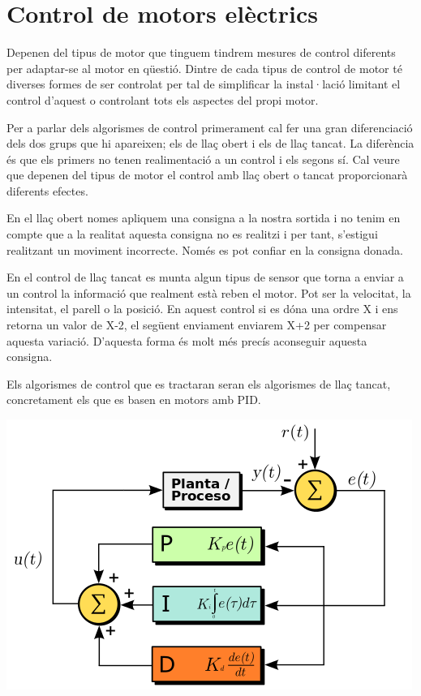 \section{Control de motors elèctrics}

Depenen del tipus de motor que tinguem tindrem mesures de control diferents per adaptar-se al motor en qüestió. Dintre de cada tipus de control de motor té diverses formes de ser controlat per tal de simplificar la instal·lació limitant el control d'aquest o controlant tots els aspectes del propi motor. 

Per a parlar dels algorismes de control primerament cal fer una gran diferenciació dels dos grups que hi apareixen; els de llaç obert i els de llaç tancat. La diferència és que els primers no tenen realimentació a un control i els segons sí. Cal veure que depenen del tipus de motor el control amb llaç obert o tancat proporcionarà diferents efectes. 

En el llaç obert nomes apliquem una consigna a la nostra sortida i no tenim en compte que a la realitat aquesta consigna no es realitzi i per tant, s'estigui realitzant un moviment incorrecte. Només es pot confiar en la consigna donada.

En el control de llaç tancat es munta algun tipus de sensor que torna a enviar a un control la informació que realment està reben el motor. Pot ser la velocitat, la intensitat, el parell o la posició. En aquest control si es dóna una ordre X i ens retorna un valor de X-2, el següent enviament enviarem X+2 per compensar aquesta variació. D'aquesta forma és molt més precís aconseguir aquesta consigna.

Els algorismes de control que es tractaran seran els algorismes de llaç tancat, concretament els que es basen en motors amb PID.

\includegraphics[width=\textwidth]{Motors/PID}

